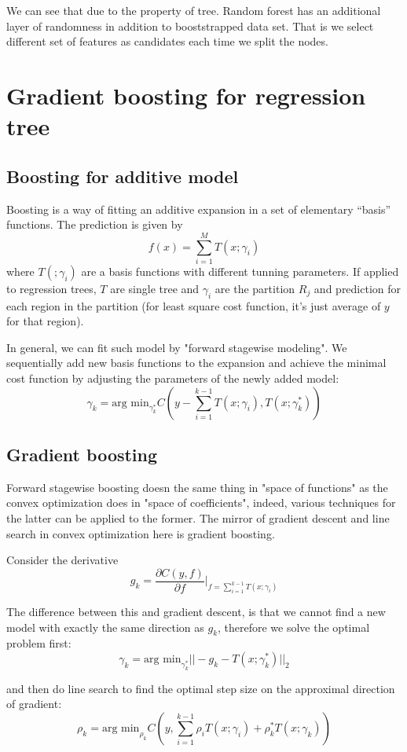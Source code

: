 \documentclass{article}
\begin{document}
We can see that due to the property of tree. Random forest has an additional layer of randomness in addition to booststrapped data set. That is we select different set of features as candidates each time we split the nodes.

\section{Gradient boosting for regression tree}
\subsection{Boosting for additive model}
Boosting is a way of fitting an additive expansion in a set of elementary “basis” functions. The prediction is given by
\[
f(x)=\sum_{i=1}^MT(x;\gamma_i)
\]
where $T(;\gamma_i)$ are a basis functions with different tunning parameters. If applied to regression trees, $T$ are single tree and $\gamma_i$ are the partition ${R_j}$ and prediction for each region in the partition (for least square cost function, it's just average of $y$ for that region).

In general, we can fit such model by "forward stagewise modeling". We sequentially add new basis functions to the expansion and achieve the minimal cost function by adjusting the parameters of the newly added model:
\[
\gamma_k=\textrm{arg min}_{\gamma_k^*}C(y-\sum_{i=1}^{k-1}T(x;\gamma_i),T(x;\gamma_k^*))
\]

\subsection{Gradient boosting}
Forward stagewise boosting doesn the same thing in "space of functions" as the convex optimization does in "space of coefficients", indeed, various techniques for the latter can be applied to the former. The mirror of gradient descent and line search in convex optimization here is gradient boosting.

Consider the derivative
\[
g_k=\frac{\partial C(y,f)}{\partial f}|_{f=\sum_{i=1}^{k-1}T(x;\gamma_i)}
\]

The difference between this and gradient descent, is that we cannot find a new model with exactly the same direction as $g_k$, therefore we solve the optimal problem first:
\[
\gamma_k=\textrm{arg min}_{\gamma_k^*}||-g_k-T(x;\gamma_k^*)||_2
\]

and then do line search to find the optimal step size on the approximal direction of gradient:
\[
\rho_k=\textrm{arg min}_{\rho_k}C(y,\sum_{i=1}^{k-1}\rho_iT(x;\gamma_i)+\rho_k^*T(x;\gamma_k))
\]
\end{document}
